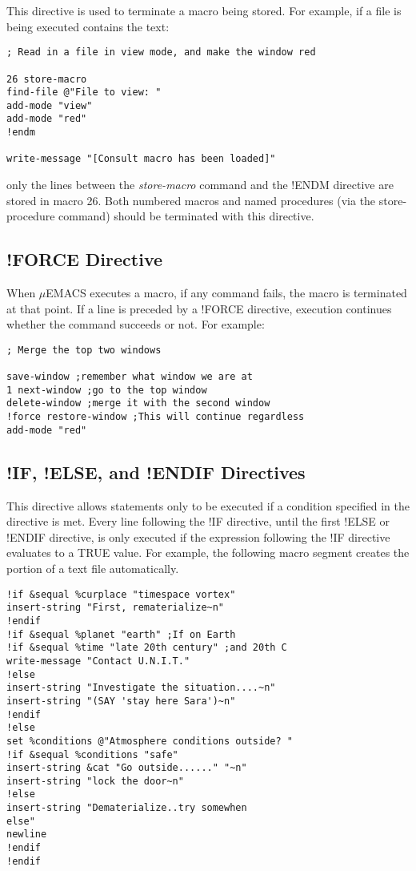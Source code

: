This directive is used to terminate a macro being stored. For example,
if a file is being executed contains the text:

\begin{verbatim}
; Read in a file in view mode, and make the window red

26 store-macro
find-file @"File to view: "
add-mode "view"
add-mode "red"
!endm

write-message "[Consult macro has been loaded]"
\end{verbatim}

only the lines between the {\it store-macro} command and the !ENDM directive
are stored in macro 26. Both numbered macros and named procedures (via
the store-procedure command) should be terminated with this directive.

\subsection{!FORCE Directive}

When $\mu$EMACS executes a macro, if any command fails, the macro is
terminated at that point. If a line is preceded by a !FORCE directive,
execution continues whether the command succeeds or not. For example:

\begin{verbatim}
; Merge the top two windows

save-window ;remember what window we are at
1 next-window ;go to the top window
delete-window ;merge it with the second window
!force restore-window ;This will continue regardless
add-mode "red"
\end{verbatim}

\subsection{!IF, !ELSE, and !ENDIF Directives}

This directive allows statements only to be executed if a condition
specified in the directive is met. Every line following the !IF
directive, until the first !ELSE or !ENDIF directive, is only executed
if the expression following the !IF directive evaluates to a TRUE
value. For example, the following macro segment creates the portion of
a text file automatically.

\begin{verbatim}
!if &sequal %curplace "timespace vortex"
insert-string "First, rematerialize~n"
!endif
!if &sequal %planet "earth" ;If on Earth
!if &sequal %time "late 20th century" ;and 20th C
write-message "Contact U.N.I.T."
!else
insert-string "Investigate the situation....~n"
insert-string "(SAY 'stay here Sara')~n"
!endif
!else
set %conditions @"Atmosphere conditions outside? "
!if &sequal %conditions "safe"
insert-string &cat "Go outside......" "~n"
insert-string "lock the door~n"
!else
insert-string "Dematerialize..try somewhen
else"
newline
!endif
!endif
\end{verbatim}


